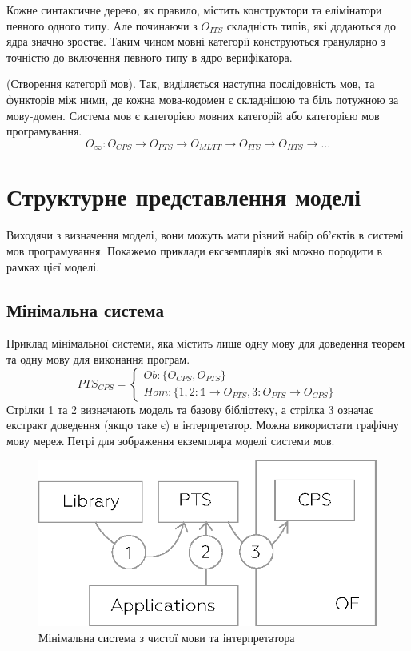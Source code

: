 Кожне синтаксичне дерево, як правило, містить конструктори
та елімінатори певного одного типу. Але починаючи з $O_{ITS}$
складність типів, які додаються до ядра значно зростає.
Таким чином мовні категорії конструються гранулярно з
точністю до включення певного типу в ядро верифікатора.

\begin{definition} (Створення категорії мов).
Так, виділяється наступна послідовність мов, та функторів між ними,
де кожна мова-кодомен є складнішою та біль потужною за мову-домен.
Система мов є категорією мовних категорій або категорією мов програмування.
\begin{equation}
O_\infty : O_{CPS} \rightarrow O_{PTS} \rightarrow O_{MLTT} \rightarrow O_{ITS} \rightarrow O_{HTS} \rightarrow ...
\end{equation}
\end{definition}

\section{Структурне представлення моделі}
Виходячи з визначення моделі, вони можуть мати різний
набір об'єктів в системі мов програмування.
Покажемо приклади ексземплярів які можно породити в рамках цієї моделі.
\newpage
\subsection{Мінімальна система}
Приклад мінімальної системи, яка містить лише одну мову для доведення теорем
та одну мову для виконання програм.
\begin{equation}
PTS_{CPS} = 
\begin{cases}
Ob: \{ O_{CPS}, O_{PTS} \} \\
Hom: \{ 1,2: \mathbb{1} \rightarrow O_{PTS}, 3: O_{PTS} \rightarrow O_{CPS} \}
\end{cases}
\end{equation}
Стрілки 1 та 2 визначають
модель та базову бібліотеку, а стрілка 3 означає екстракт
доведення (якщо таке є) в інтерпретатор. Можна використати графічну
мову мереж Петрі для зображення екземпляра моделі системи мов.
\begin{figure}[h]
  \centerline{\includegraphics[scale=0.5]{minimal.eps}}
  \caption{Мінімальна система з чистої мови та інтерпретатора}
\end{figure}

